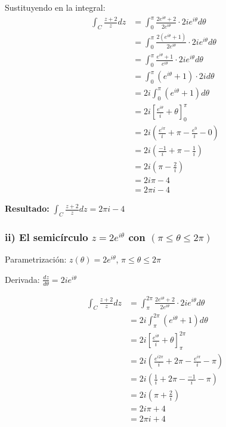 \documentclass{article}
\begin{document}
Sustituyendo en la integral:
\begin{align*}
\int_C \frac{z + 2}{z} dz &= \int_0^{\pi} \frac{2e^{i\theta} + 2}{2e^{i\theta}} \cdot 2ie^{i\theta} d\theta \\
                          &= \int_0^{\pi} \frac{2(e^{i\theta} + 1)}{2e^{i\theta}} \cdot 2ie^{i\theta} d\theta \\
                          &= \int_0^{\pi} \frac{e^{i\theta} + 1}{e^{i\theta}} \cdot 2ie^{i\theta} d\theta \\
                          &= \int_0^{\pi} (e^{i\theta} + 1) \cdot 2i d\theta \\
                          &= 2i \int_0^{\pi} (e^{i\theta} + 1) d\theta \\
                          &= 2i \left[\frac{e^{i\theta}}{i} + \theta\right]_0^{\pi} \\
                          &= 2i \left(\frac{e^{i\pi}}{i} + \pi - \frac{e^0}{i} - 0\right) \\
                          &= 2i \left(\frac{-1}{i} + \pi - \frac{1}{i}\right) \\
                          &= 2i \left(\pi - \frac{2}{i}\right) \\
                          &= 2i\pi - 4 \\
                          &= 2\pi i - 4
\end{align*}

\textbf{Resultado:} $\int_C \frac{z + 2}{z} dz = 2\pi i - 4$

\subsubsection*{ii) El semicírculo $z = 2e^{i\theta}$ con $(\pi \leq \theta \leq 2\pi)$}

Parametrización: $z(\theta) = 2e^{i\theta}$, $\pi \leq \theta \leq 2\pi$

Derivada: $\frac{dz}{d\theta} = 2ie^{i\theta}$

\begin{align*}
\int_C \frac{z + 2}{z} dz &= \int_{\pi}^{2\pi} \frac{2e^{i\theta} + 2}{2e^{i\theta}} \cdot 2ie^{i\theta} d\theta \\
                          &= 2i \int_{\pi}^{2\pi} (e^{i\theta} + 1) d\theta \\
                          &= 2i \left[\frac{e^{i\theta}}{i} + \theta\right]_{\pi}^{2\pi} \\
                          &= 2i \left(\frac{e^{i2\pi}}{i} + 2\pi - \frac{e^{i\pi}}{i} - \pi\right) \\
                          &= 2i \left(\frac{1}{i} + 2\pi - \frac{-1}{i} - \pi\right) \\
                          &= 2i \left(\pi + \frac{2}{i}\right) \\
                          &= 2i\pi + 4 \\
                          &= 2\pi i + 4
\end{align*}
\end{document}
